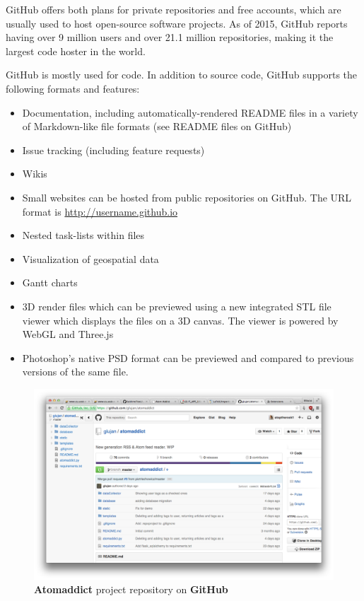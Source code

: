 \documentclass[12pt]{article}
\begin{document}
GitHub offers both plans for private repositories and free accounts, which are usually used to host open-source software projects. As of 2015, GitHub reports having over 9 million users and over 21.1 million repositories, making it the largest code hoster in the world.

GitHub is mostly used for code.
In addition to source code, GitHub supports the following formats and features:
\begin{itemize}
\item Documentation, including automatically-rendered README files in a variety of Markdown-like file formats (see README files on GitHub)
\item Issue tracking (including feature requests)
\item Wikis
\item Small websites can be hosted from public repositories on GitHub. The URL format is \url{http://username.github.io}
\item Nested task-lists within files
\item Visualization of geospatial data
\item Gantt charts
\item 3D render files which can be previewed using a new integrated STL file viewer which displays the files on a 3D canvas. The viewer is powered by WebGL and Three.js
\item Photoshop's native PSD format can be previewed and compared to previous versions of the same file.~\cite{wiki:github}
\end{itemize}

\begin{figure}[H]
    \centering
    \includegraphics[width=\textwidth]{images/github.png}
    \caption{\textbf{Atomaddict} project repository on \textbf{GitHub}}
    \label{fig:github}
\end{figure}
\end{document}

